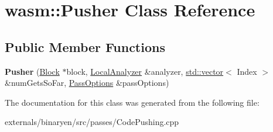 \hypertarget{classwasm_1_1_pusher}{}\section{wasm\+:\+:Pusher Class Reference}
\label{classwasm_1_1_pusher}
\subsection*{Public Member Functions}
\begin{DoxyCompactItemize}
\item 
\mbox{\label{classwasm_1_1_pusher_ae72ed7d28e3ceb54c4cb586cb47e8c49}} 
{\bfseries Pusher} (\mbox{\hyperlink{classwasm_1_1_block}{Block}} $\ast$block, \mbox{\hyperlink{structwasm_1_1_local_analyzer}{Local\+Analyzer}} \&analyzer, \mbox{\hyperlink{classstd_1_1vector}{std\+::vector}}$<$ Index $>$ \&num\+Gets\+So\+Far, \mbox{\hyperlink{structwasm_1_1_pass_options}{Pass\+Options}} \&pass\+Options)
\end{DoxyCompactItemize}


The documentation for this class was generated from the following file\+:\begin{DoxyCompactItemize}
\item 
externals/binaryen/src/passes/Code\+Pushing.\+cpp\end{DoxyCompactItemize}
